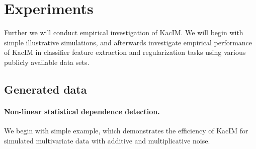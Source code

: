 \documentclass{article}
\begin{document}
\section{Experiments}
\label{section:experiments}

Further we will conduct empirical investigation of KacIM. We will begin with simple illustrative simulations, and afterwards investigate empirical performance of KacIM in classifier feature extraction and regularization tasks using various publicly available data sets.

\subsection{Generated data}

\paragraph{Non-linear statistical dependence detection.} We begin with simple example, which demonstrates the efficiency of KacIM for simulated multivariate data with additive and multiplicative noise.
\end{document}
